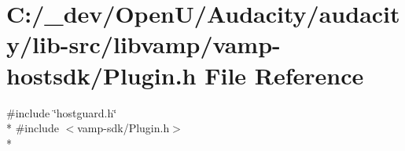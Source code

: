 \hypertarget{libvamp_2vamp-hostsdk_2plugin_8h}{}\section{C\+:/\+\_\+dev/\+Open\+U/\+Audacity/audacity/lib-\/src/libvamp/vamp-\/hostsdk/\+Plugin.h File Reference}
\label{libvamp_2vamp-hostsdk_2plugin_8h}
{\ttfamily \#include \char`\"{}hostguard.\+h\char`\"{}}\\*
{\ttfamily \#include $<$vamp-\/sdk/\+Plugin.\+h$>$}\\*
